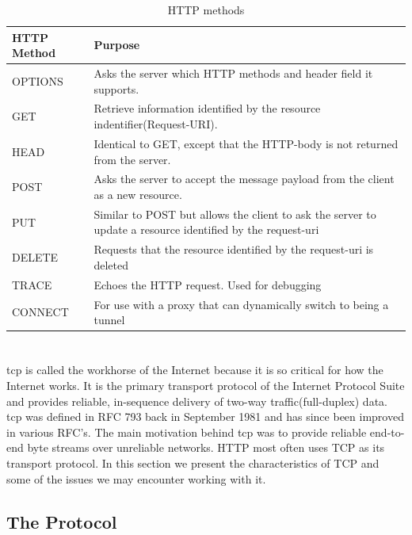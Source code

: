  \begin{table}[h]
 \begin{tabularx}{\textwidth}{| X | X |}
 \hline
   \textbf{HTTP Method} & \textbf{Purpose} \\ \hline
   OPTIONS & Asks the server which HTTP methods and header field it supports. \\ \hline
   GET & Retrieve information identified by the resource indentifier(Request-URI). \\ \hline
   HEAD & Identical to GET, except that the HTTP-body is not returned from the server. \\ \hline
   POST & Asks the server to accept the message payload from the client as a new resource.\\ \hline
   PUT & Similar to POST but allows the client to ask the server to update a resource identified by the request-uri \\ \hline
   DELETE & Requests that the resource identified by the request-uri is deleted \\ \hline
   TRACE & Echoes the HTTP request. Used for debugging \\ \hline
   CONNECT & For use with a proxy that can dynamically switch to being a tunnel\\ \hline
 \end{tabularx}
 \caption{HTTP methods}
 \label{table-http-methods}
 \end{table}

\section{}
\label{tcp}

\gls{tcp} is called the workhorse of the Internet because it is so critical for
how the Internet works. It is the primary transport protocol of the Internet
Protocol Suite\cite{rfc-1122} and provides reliable, in-sequence delivery of
two-way traffic(full-duplex) data.  \gls{tcp} was defined in RFC
793\cite{rfc-793} back in September 1981 and has since been improved in various
RFC's. The main motivation behind \gls{tcp} was to provide reliable end-to-end
byte streams over unreliable networks.  HTTP most often uses TCP as its
transport protocol. In this section we present the characteristics of TCP and
some of the issues we may encounter working with it.

 \subsection{The Protocol}

